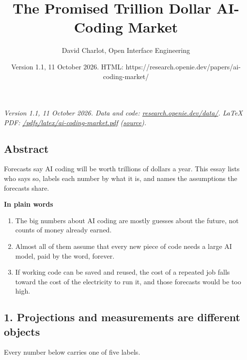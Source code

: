 \documentclass[
  10pt,
]{article}
\title{The Promised Trillion Dollar AI-Coding Market}
\author{David Charlot, Open Interface Engineering}
\date{Version 1.1, 11 October 2026. HTML:
https://research.openie.dev/papers/ai-coding-market/}
\providecommand{\tightlist}{%
  \setlength{\itemsep}{0pt}\setlength{\parskip}{0pt}}
\begin{document}
\maketitle

{
\setcounter{tocdepth}{2}
\tableofcontents
}
\emph{Version 1.1, 11 October 2026. Data and code:
\href{https://research.openie.dev/data/\#economics}{research.openie.dev/data/}.
LaTeX PDF:
\href{https://research.openie.dev/pdfs/latex/ai-coding-market.pdf}{/pdfs/latex/ai-coding-market.pdf}
(\href{https://research.openie.dev/pdfs/latex/ai-coding-market.tex}{source}).}

\subsection{Abstract}\label{abstract}

Forecasts say AI coding will be worth trillions of dollars a year. This
essay lists who says so, labels each number by what it is, and names the
assumptions the forecasts share.

\textbf{In plain words}

\begin{enumerate}
\def\labelenumi{\arabic{enumi}.}
\tightlist
\item
  The big numbers about AI coding are mostly guesses about the future,
  not counts of money already earned.
\item
  Almost all of them assume that every new piece of code needs a large
  AI model, paid by the word, forever.
\item
  If working code can be saved and reused, the cost of a repeated job
  falls toward the cost of the electricity to run it, and those
  forecasts would be too high.
\end{enumerate}

\subsection{1. Projections and measurements are different
objects}\label{projections-and-measurements-are-different-objects}

Every number below carries one of five labels.
\end{document}
